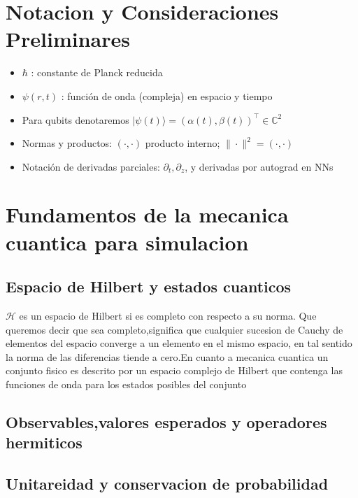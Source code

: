 \documentclass{GEM-JNL-FMP}
\theoremstyle{definition}
\numberwithin{equation}{section}
\begin{document}
\section{Notacion y Consideraciones Preliminares}

\begin{itemize}
    \item $\hbar$ : constante de Planck reducida
    \item $\psi(r, t)$ : función de onda (compleja) en espacio y tiempo
    \item Para qubits denotaremos $|\psi(t)\rangle = (\alpha(t), \beta(t))^\top \in \mathbb{C}^2$
    \item Normas y productos: $(\cdot, \cdot)$ producto interno; $\|\cdot\|^2 = (\cdot, \cdot)$
    \item Notación de derivadas parciales: $\partial_t, \partial_z$, y derivadas por autograd en NNs
\end{itemize}


\section{Fundamentos de la mecanica cuantica para simulacion}

\subsection{Espacio de Hilbert y estados cuanticos}

$\mathcal{H}$ es un espacio de Hilbert si es completo con respecto a su norma. Que queremos decir que sea completo,significa que cualquier sucesion de 
Cauchy de elementos del espacio converge a un elemento en el mismo espacio, en tal sentido la norma de las diferencias tiende a cero.En cuanto a mecanica cuantica 
un conjunto fisico es descrito por un espacio complejo de Hilbert que contenga las funciones de onda para los estados posibles del conjunto   

\subsection{Observables,valores esperados y operadores hermiticos}

\subsection{Unitareidad y conservacion de probabilidad}
\end{document}
